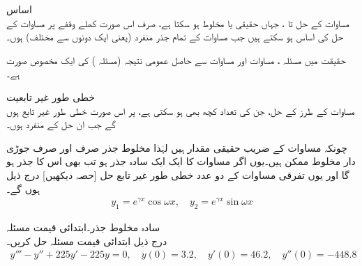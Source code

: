  \quad اساس\\
مساوات  کے حل  تا ، جہاں  حقیقی یا مخلوط ہو سکتا ہے، صرف اس صورت کھلے وقفے پر مساوات  کے حل کی اساس ہو سکتے ہیں جب مساوات  کے تمام  جذر منفرد (یعنی ایک دونوں سے مختلف) ہوں۔

حقیقت میں مسئلہ ، مساوات  اور مساوات  سے حاصل عمومی نتیجہ (مسئلہ ) کی ایک مخصوص صورت ہے۔

 \quad خطی طور غیر تابعیت\\
مساوات  کے  طرز کے حل، جن کی تعداد کچھ بھی ہو سکتی ہے،   پر اس صورت خطی طور غیر تابع ہوں گے جب ان حل کے   منفرد ہوں۔

چونکہ مساوات  کے  ضریب  حقیقی مقدار ہیں لہٰذا مخلوط جذر صرف اور صرف جوڑی دار مخلوط ممکن ہیں۔یوں اگر مساوات  کا ایک ایک سادہ جذر  ہو تب  بھی اس کا جذر ہو گا اور یوں تفرقی مساوات کے دو عدد خطی طور غیر تابع حل [حصہ  دیکھیں] درج ذیل ہوں گے۔
\begin{align*}
y_1=e^{\gamma x} \cos \omega x, \quad y_2=e^{\gamma x} \sin \omega x
\end{align*}

\quad سادہ مخلوط جذر۔ابتدائی قیمت مسئلہ\\
درج ذیل ابتدائی قیمت مسئلہ حل کریں۔
\begin{align*}
y'''-y''+225y'-225y=0, \quad y(0)=3.2, \quad y'(0)=46.2, \quad y''(0)=-448.8
\end{align*}

